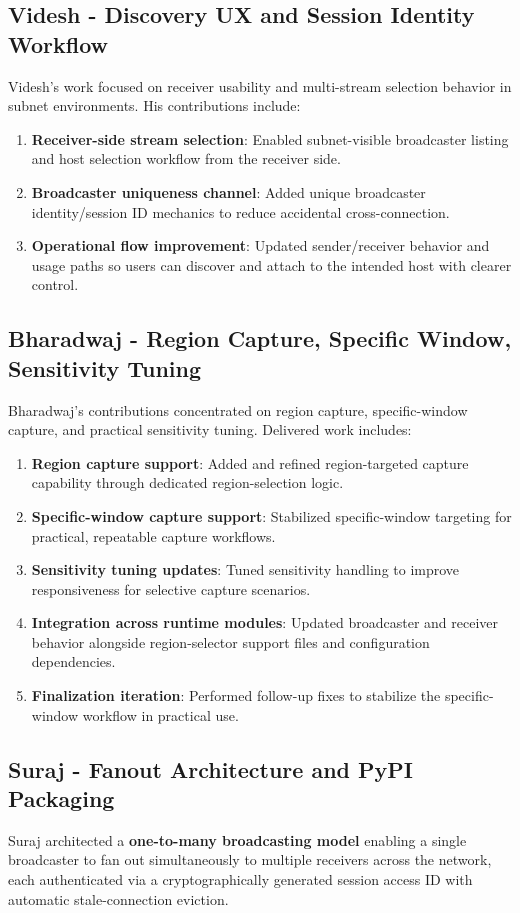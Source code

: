 \documentclass[12pt,a4paper]{article}
\begin{document}
\subsection{Videsh - Discovery UX and Session Identity Workflow}
Videsh's work focused on receiver usability and multi-stream selection behavior in subnet environments. His contributions include:
\begin{enumerate}[label=\textbf{\arabic*.}, itemsep=6pt]
  \item \textbf{Receiver-side stream selection}: Enabled subnet-visible broadcaster listing and host selection workflow from the receiver side.
  \item \textbf{Broadcaster uniqueness channel}: Added unique broadcaster identity/session ID mechanics to reduce accidental cross-connection.
  \item \textbf{Operational flow improvement}: Updated sender/receiver behavior and usage paths so users can discover and attach to the intended host with clearer control.
\end{enumerate}

\subsection{Bharadwaj - Region Capture, Specific Window, Sensitivity Tuning}
Bharadwaj's contributions concentrated on region capture, specific-window capture, and practical sensitivity tuning. Delivered work includes:
\begin{enumerate}[label=\textbf{\arabic*.}, itemsep=6pt]
  \item \textbf{Region capture support}: Added and refined region-targeted capture capability through dedicated region-selection logic.
  \item \textbf{Specific-window capture support}: Stabilized specific-window targeting for practical, repeatable capture workflows.
  \item \textbf{Sensitivity tuning updates}: Tuned sensitivity handling to improve responsiveness for selective capture scenarios.
  \item \textbf{Integration across runtime modules}: Updated broadcaster and receiver behavior alongside region-selector support files and configuration dependencies.
  \item \textbf{Finalization iteration}: Performed follow-up fixes to stabilize the specific-window workflow in practical use.
\end{enumerate}

\subsection{Suraj - Fanout Architecture and PyPI Packaging}
Suraj architected a \textbf{one-to-many broadcasting model} enabling a single broadcaster to fan out simultaneously to multiple receivers across the network, each authenticated via a cryptographically generated session access ID with automatic stale-connection eviction.
\end{document}
